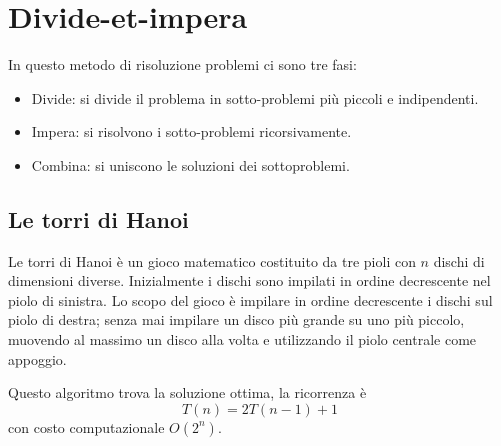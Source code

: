 \chapter{Divide-et-impera}
In questo metodo di risoluzione problemi ci sono tre fasi: 
\begin{itemize}
\item Divide: si divide il problema in sotto-problemi pi\`u piccoli e indipendenti.
\item Impera: si risolvono i sotto-problemi ricorsivamente.
\item Combina: si uniscono le soluzioni dei sottoproblemi. 
\end{itemize}
\section{Le torri di Hanoi}
Le torri di Hanoi \`e un gioco matematico costituito da tre pioli con $n$ dischi di dimensioni diverse. Inizialmente i dischi sono impilati in ordine decrescente nel piolo di sinistra. Lo scopo del gioco \`e impilare
in ordine decrescente i dischi sul piolo di destra; senza mai impilare un disco pi\`u grande su uno pi\`u piccolo, muovendo al massimo un disco alla volta e utilizzando il piolo centrale come appoggio. 
\begin{multicols}{2}
\begin{algorithm}[H]
\DontPrintSemicolon
{}



\SetKwFunction{}{}
\SetKwFunction{}{}
\SetKwFunction{}{}
\SetKwFunction{}{}
\SetKwFunction{}{}

\caption{\protect{}}


\end{algorithm}
Questo algoritmo trova la soluzione ottima, la ricorrenza \`e $$T(n) = 2T(n-1)+1$$ con costo computazionale $O(2^n)$.
\end{multicols}

